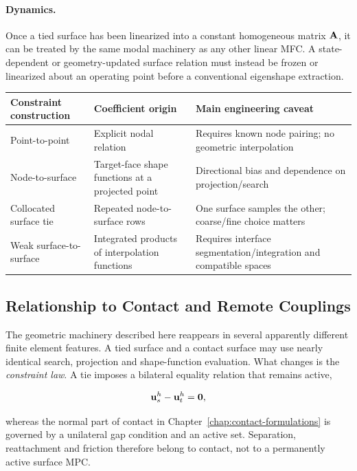 \paragraph{Dynamics.}
Once a tied surface has been linearized into a constant homogeneous matrix
$\mathbf{A}$, it can be treated by the same modal machinery as any other linear MFC.
A state-dependent or geometry-updated surface relation must instead be frozen or
linearized about an operating point before a conventional eigenshape extraction.

\begin{center}
\begin{tabular}{|p{}|p{}|p{}|}
\hline
\textbf{Constraint construction} & \textbf{Coefficient origin} & \textbf{Main engineering caveat}\\
\hline
Point-to-point & Explicit nodal relation & Requires known node pairing; no geometric interpolation\\
\hline
Node-to-surface & Target-face shape functions at a projected point & Directional bias and dependence on projection/search\\
\hline
Collocated surface tie & Repeated node-to-surface rows & One surface samples the other; coarse/fine choice matters\\
\hline
Weak surface-to-surface & Integrated products of interpolation functions & Requires interface segmentation/integration and compatible spaces\\
\hline
\end{tabular}
\end{center}

\subsection{Relationship to Contact and Remote Couplings}

The geometric machinery described here reappears in several apparently
different finite element features. A tied surface and a contact surface may use
nearly identical search, projection and shape-function evaluation. What changes
is the \textit{constraint law}. A tie imposes a bilateral equality relation that
remains active,

\begin{equation}
    \mathbf{u}_s^h-\mathbf{u}_t^h=\mathbf{0},
\end{equation}

whereas the normal part of contact in
Chapter~\ref{chap:contact-formulations} is governed by a unilateral gap
condition and an active set. Separation, reattachment and friction therefore
belong to contact, not to a permanently active surface MPC.

